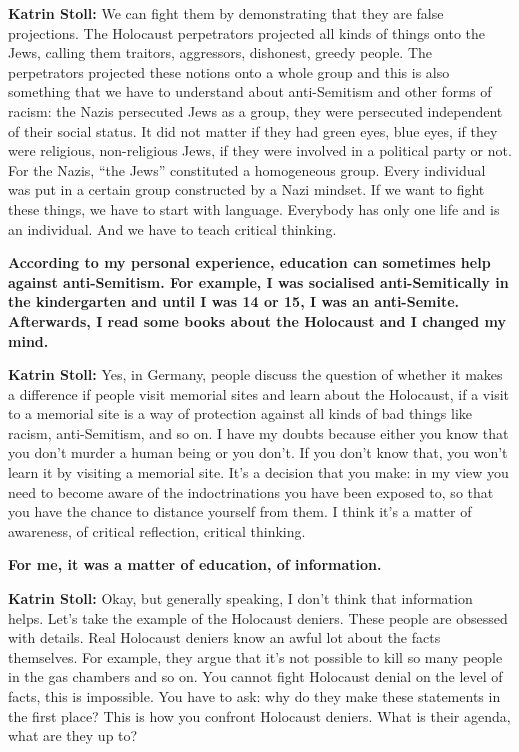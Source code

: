 \textbf{Katrin Stoll:} We can fight them by demonstrating that they are false projections. The Holocaust perpetrators projected all kinds of things onto the Jews, calling them traitors, aggressors, dishonest, greedy people. The perpetrators projected these notions onto a whole group and this is also something that we have to understand about anti-Semitism and other forms of racism: the Nazis persecuted Jews as a group, they were persecuted independent of their social status. It did not matter if they had green eyes, blue eyes, if they were religious, non-religious Jews, if they were involved in a political party or not. For the Nazis, ``the Jews'' constituted a homogeneous group. Every individual was put in a certain group constructed by a Nazi mindset. If we want to fight these things, we have to start with language. Everybody has only one life and is an individual. And we have to teach critical thinking.   

\textbf{According to my personal experience, education can sometimes help against anti-Semitism. For example, I was socialised anti-Semitically in the kindergarten and until I was 14 or 15, I was an anti-Semite. Afterwards, I read some books about the Holocaust and I changed my mind.}

\textbf{Katrin Stoll:} Yes, in Germany, people discuss the question of whether it makes a difference if people visit memorial sites and learn about the Holocaust, if a visit to a memorial site is a way of protection against all kinds of bad things like racism, anti-Semitism, and so on. I have my doubts because either you know that you don’t murder a human being or you don’t. If you don’t know that, you won’t learn it by visiting a memorial site. It’s a decision that you make: in my view you need to become aware of the indoctrinations you have been exposed to, so that you have the chance to distance yourself from them. I think it’s a matter of awareness, of critical reflection, critical thinking.

\textbf{For me, it was a matter of education, of information.} 

\textbf{Katrin Stoll:} Okay, but generally speaking, I don’t think that information helps. Let’s take the example of the Holocaust deniers. These people are obsessed with details. Real Holocaust deniers know an awful lot about the facts themselves. For example, they argue that it’s not possible to kill so many people in the gas chambers and so on. You cannot fight Holocaust denial on the level of facts, this is impossible. You have to ask: why do they make these statements in the first place? This is how you confront Holocaust deniers. What is their agenda, what are they up to? 

